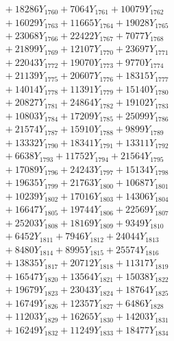 \documentclass[a4paper,10pt]{article}
\begin{document}
{\begin{align}
&\;  + 18286 Y_{1760} + 7064 Y_{1761} + 10079 Y_{1762} \\[0.3ex]
&\;  + 16029 Y_{1763} + 11665 Y_{1764} + 19028 Y_{1765} \\[0.3ex]
&\;  + 23068 Y_{1766} + 22422 Y_{1767} + 7077 Y_{1768} \\[0.5ex]\allowbreak
&\;  + 21899 Y_{1769} + 12107 Y_{1770} + 23697 Y_{1771} \\[0.3ex]
&\;  + 22043 Y_{1772} + 19070 Y_{1773} + 9770 Y_{1774} \\[0.3ex]
&\;  + 21139 Y_{1775} + 20607 Y_{1776} + 18315 Y_{1777} \\[0.3ex]
&\;  + 14014 Y_{1778} + 11391 Y_{1779} + 15140 Y_{1780} \\[0.3ex]
&\;  + 20827 Y_{1781} + 24864 Y_{1782} + 19102 Y_{1783} \\[0.3ex]
&\;  + 10803 Y_{1784} + 17209 Y_{1785} + 25099 Y_{1786} \\[0.3ex]
&\;  + 21574 Y_{1787} + 15910 Y_{1788} + 9899 Y_{1789} \\[0.3ex]
&\;  + 13332 Y_{1790} + 18341 Y_{1791} + 13311 Y_{1792} \\[0.3ex]
&\;  + 6638 Y_{1793} + 11752 Y_{1794} + 21564 Y_{1795} \\[0.3ex]
&\;  + 17089 Y_{1796} + 24243 Y_{1797} + 15134 Y_{1798} \\[0.5ex]\allowbreak
&\;  + 19635 Y_{1799} + 21763 Y_{1800} + 10687 Y_{1801} \\[0.3ex]
&\;  + 10239 Y_{1802} + 17016 Y_{1803} + 14306 Y_{1804} \\[0.3ex]
&\;  + 16647 Y_{1805} + 19744 Y_{1806} + 22569 Y_{1807} \\[0.3ex]
&\;  + 25203 Y_{1808} + 18169 Y_{1809} + 9349 Y_{1810} \\[0.3ex]
&\;  + 6452 Y_{1811} + 7946 Y_{1812} + 24044 Y_{1813} \\[0.3ex]
&\;  + 8480 Y_{1814} + 8995 Y_{1815} + 25574 Y_{1816} \\[0.3ex]
&\;  + 13835 Y_{1817} + 20712 Y_{1818} + 11317 Y_{1819} \\[0.3ex]
&\;  + 16547 Y_{1820} + 13564 Y_{1821} + 15038 Y_{1822} \\[0.3ex]
&\;  + 19679 Y_{1823} + 23043 Y_{1824} + 18764 Y_{1825} \\[0.3ex]
&\;  + 16749 Y_{1826} + 12357 Y_{1827} + 6486 Y_{1828} \\[0.5ex]\allowbreak
&\;  + 11203 Y_{1829} + 16265 Y_{1830} + 14203 Y_{1831} \\[0.3ex]
&\;  + 16249 Y_{1832} + 11249 Y_{1833} + 18477 Y_{1834} \\[0.3ex]

\end{align}}
\end{document}
